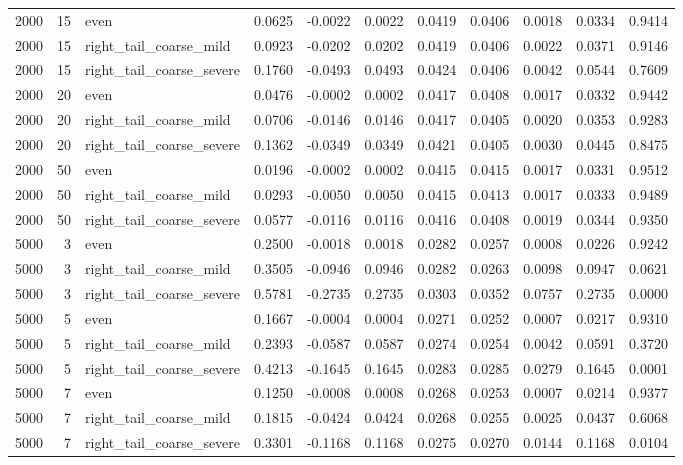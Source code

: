 \begin{table}[!h]
{\begin{tabular}[t]{rrlrrrrrrrr}
2000 & 15 & even & 0.0625 & -0.0022 & 0.0022 & 0.0419 & 0.0406 & 0.0018 & 0.0334 & 0.9414\\
2000 & 15 & right\_tail\_coarse\_mild & 0.0923 & -0.0202 & 0.0202 & 0.0419 & 0.0406 & 0.0022 & 0.0371 & 0.9146\\
2000 & 15 & right\_tail\_coarse\_severe & 0.1760 & -0.0493 & 0.0493 & 0.0424 & 0.0406 & 0.0042 & 0.0544 & 0.7609\\
2000 & 20 & even & 0.0476 & -0.0002 & 0.0002 & 0.0417 & 0.0408 & 0.0017 & 0.0332 & 0.9442\\
2000 & 20 & right\_tail\_coarse\_mild & 0.0706 & -0.0146 & 0.0146 & 0.0417 & 0.0405 & 0.0020 & 0.0353 & 0.9283\\
2000 & 20 & right\_tail\_coarse\_severe & 0.1362 & -0.0349 & 0.0349 & 0.0421 & 0.0405 & 0.0030 & 0.0445 & 0.8475\\
2000 & 50 & even & 0.0196 & -0.0002 & 0.0002 & 0.0415 & 0.0415 & 0.0017 & 0.0331 & 0.9512\\
2000 & 50 & right\_tail\_coarse\_mild & 0.0293 & -0.0050 & 0.0050 & 0.0415 & 0.0413 & 0.0017 & 0.0333 & 0.9489\\
2000 & 50 & right\_tail\_coarse\_severe & 0.0577 & -0.0116 & 0.0116 & 0.0416 & 0.0408 & 0.0019 & 0.0344 & 0.9350\\
5000 & 3 & even & 0.2500 & -0.0018 & 0.0018 & 0.0282 & 0.0257 & 0.0008 & 0.0226 & 0.9242\\
5000 & 3 & right\_tail\_coarse\_mild & 0.3505 & -0.0946 & 0.0946 & 0.0282 & 0.0263 & 0.0098 & 0.0947 & 0.0621\\
5000 & 3 & right\_tail\_coarse\_severe & 0.5781 & -0.2735 & 0.2735 & 0.0303 & 0.0352 & 0.0757 & 0.2735 & 0.0000\\
5000 & 5 & even & 0.1667 & -0.0004 & 0.0004 & 0.0271 & 0.0252 & 0.0007 & 0.0217 & 0.9310\\
5000 & 5 & right\_tail\_coarse\_mild & 0.2393 & -0.0587 & 0.0587 & 0.0274 & 0.0254 & 0.0042 & 0.0591 & 0.3720\\
5000 & 5 & right\_tail\_coarse\_severe & 0.4213 & -0.1645 & 0.1645 & 0.0283 & 0.0285 & 0.0279 & 0.1645 & 0.0001\\
5000 & 7 & even & 0.1250 & -0.0008 & 0.0008 & 0.0268 & 0.0253 & 0.0007 & 0.0214 & 0.9377\\
5000 & 7 & right\_tail\_coarse\_mild & 0.1815 & -0.0424 & 0.0424 & 0.0268 & 0.0255 & 0.0025 & 0.0437 & 0.6068\\
5000 & 7 & right\_tail\_coarse\_severe & 0.3301 & -0.1168 & 0.1168 & 0.0275 & 0.0270 & 0.0144 & 0.1168 & 0.0104\\

\end{tabular}}
\end{table}

